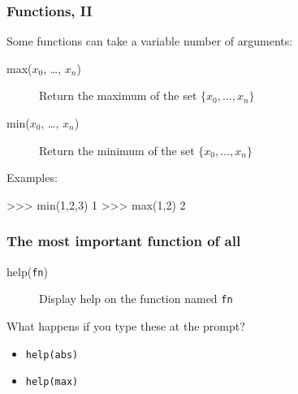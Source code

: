 \documentclass[english,serif,mathserif,xcolor=pdftex,dvipsnames,table]{beamer}
\begin{document}
\begin{frame}[fragile]
  \frametitle{Functions, II}
  Some functions can take a variable number of arguments:
  \begin{description}
    \item[max($x_0$, \ldots, $x_n$)] Return the maximum of the set $\{ x_0, \ldots, x_n \}$
    \item[min($x_0$, \ldots, $x_n$)] Return the minimum of the set $\{ x_0, \ldots, x_n \}$
  \end{description}

  \+
  Examples:
\begin{semiverbatim}
>>> min(1,2,3)
1
>>> max(1,2)
2
\end{semiverbatim}
\end{frame}


\begin{frame}[fragile]
  \frametitle{The most important function of all}
  \begin{description}
  \item[help(\texttt{fn})] Display help on the function named \texttt{fn}
  \end{description}

  \+
  \begin{question}
    What happens if you type these at the prompt?
    \begin{itemize}
    \item \texttt{help(abs)}
    \item \texttt{help(max)}
    \end{itemize}
  \end{question}
\end{frame}






\end{document}
